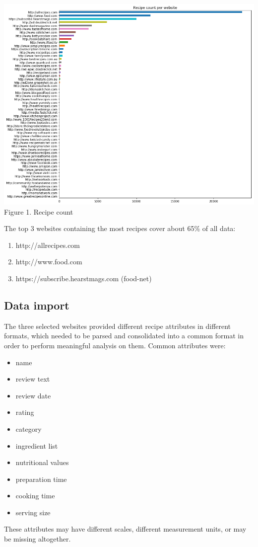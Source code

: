 \documentclass[11pt]{article}
\begin{document}
\vspace{5mm}
\begin{center}
\includegraphics[scale=0.22]{website-count}
\label{website-count} Figure 1. Recipe count
\end{center}
\vspace{5mm}

The top 3 websites containing the most recipes cover about 65\% of all data: 
\begin{enumerate}\itemsep0em
    \item http://allrecipes.com
    \item http://www.food.com
    \item https://subscribe.hearstmags.com (food-net)
\end{enumerate}

\subsection{Data import}

The three selected websites provided different recipe attributes in different formats, which needed to be parsed and consolidated into a common format in order to perform meaningful analysis on them.
Common attributes were:
\begin{itemize}\itemsep0em
    \item name
    \item review text
    \item review date
    \item rating
    \item category
    \item ingredient list
    \item nutritional values
    \item preparation time
    \item cooking time
    \item serving size
\end{itemize}
These attributes may have different scales, different measurement units, or may be missing altogether. 
\end{document}
